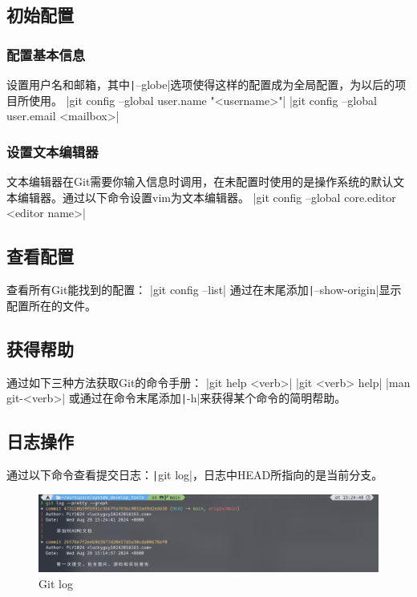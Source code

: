 \documentclass[fontset=ubuntu]{ctexart}
\begin{document}
\subsection{初始配置}
\subsubsection{配置基本信息}
设置用户名和邮箱，其中\texttt|--globe|选项使得这样的配置成为全局配置，为以后的项目所使用。
|git config --global user.name "<username>"|
|git config --global user.email <mailbox>|

\subsubsection{设置文本编辑器}
文本编辑器在Git需要你输入信息时调用，在未配置时使用的是操作系统的默认文本编辑器。通过以下命令设置vim为文本编辑器。
|git config --global core.editor <editor name>|

\subsection{查看配置}
查看所有Git能找到的配置：
|git config --list|
通过在末尾添加\texttt|--show-origin|显示配置所在的文件。

\subsection{获得帮助}
通过如下三种方法获取Git的命令手册：
|git help <verb>|
|git <verb> help|
|man git-<verb>|
或通过在命令末尾添加\texttt|-h|来获得某个命令的简明帮助。

\subsection{日志操作}
通过以下命令查看提交日志：\texttt|git log|，日志中HEAD所指向的是当前分支。
\begin{figure}[htb]
    \centering
    \includegraphics[width=0.75\linewidth]{git_log_1.png}
    \caption{Git log}
    \label{fig:git_log_1}
\end{figure}
\end{document}
